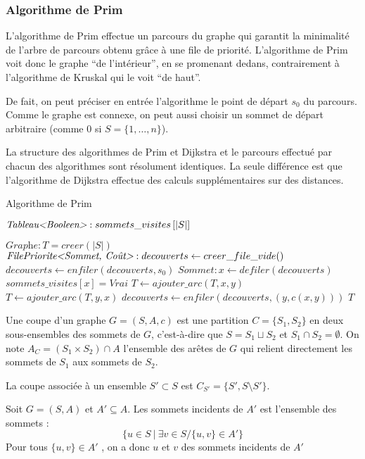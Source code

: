 \documentclass[../../../main.tex]{subfiles}
\begin{document}
\subsubsection{Algorithme de Prim}
L'algorithme de Prim effectue un parcours du graphe qui garantit la minimalité de l'arbre de parcours
obtenu grâce à une file de priorité. L'algorithme de Prim voit donc le graphe ``de l'intérieur'', en se
promenant dedans, contrairement à l'algorithme de Kruskal qui le voit ``de haut''.

De fait, on peut préciser en entrée l'algorithme le point de départ $s_0$ du parcours. Comme le graphe
est connexe, on peut aussi choisir un sommet de départ arbitraire (comme $0$ si $S = \{1, \dots, n\}$).

La structure des algorithmes de Prim et Dijkstra et le parcours effectué par chacun des algorithmes
sont résolument identiques. La seule différence est que l'algorithme de Dijkstra effectue des calculs supplémentaires sur
des distances.

\begin{algorithm}
\caption{Algorithme de Prim\label{alg:prim}}
$\textit{Tableau\textless Booleen\textgreater }:sommets\_visites\left[|S|\right]$\;

$\textit{Graphe}:T = creer(|S|)$\;
$\textit{FilePriorite\textless Sommet, Coût\textgreater }:decouverts\leftarrow creer\_file\_vide()$
$decouverts \leftarrow enfiler(decouverts, s_0)$\;
 {
	$Sommet:x\leftarrow defiler(decouverts)$
	 {
		$sommets\_visites[x] = \textit{Vrai}$\;
		$T\leftarrow ajouter\_arc(T, x, y)$\;
		$T\leftarrow ajouter\_arc(T, y, x)$\;
		 {
			$decouverts\leftarrow enfiler(decouverts, (y, c(x, y)))$\;
		}
	}
}
\Return $T$\;
\end{algorithm}

 {
	Une coupe d'un graphe $G = (S, A, c)$ est une partition $C = \{S_1, S_2\}$ en deux sous-ensembles
des sommets de $G$, c'est-à-dire que $S = S_1 \sqcup S_2$ et $S_1\cap S_2 = \emptyset$.\newline
On note $A_C = (S_1\times S_2 )\cap A$ l'ensemble des arêtes de $G$ qui relient directement les sommets de
$S_1$ aux sommets de $S_2$.\newline

La coupe associée à un ensemble $S'\subset S$ est $C_{S'} = \{S', S\setminus S'\}$.
}
 {
	Soit $G = (S, A)$ et $A' \subseteq A$. Les sommets incidents de $A'$ est l'ensemble des sommets :
$$\{u \in S\ |\ \exists v \in S/\{u, v\}\in A'\}$$
Pour tous $\{u, v\}\in A'$ , on a donc $u$ et $v$ des sommets incidents de $A'$
}
\end{document}
